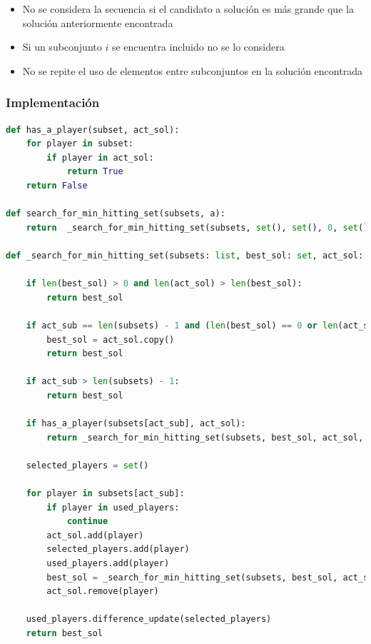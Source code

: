 \begin{itemize}
    \item No se considera la secuencia si el candidato a solución es más grande que la solución anteriormente encontrada \\
    \item Si un subconjunto $i$ se encuentra incluido no se lo considera \\
    \item No se repite el uso de elementos entre subconjuntos en la solución encontrada \\
\end{itemize}

\subsubsection{Implementación}  
\begin{lstlisting}[language=Python, caption= solución por backtracking, label=python_code]
def has_a_player(subset, act_sol):
    for player in subset:
        if player in act_sol:
            return True
    return False

def search_for_min_hitting_set(subsets, a):
    return  _search_for_min_hitting_set(subsets, set(), set(), 0, set())

def _search_for_min_hitting_set(subsets: list, best_sol: set, act_sol: set, act_sub: int, used_players: set): 

    if len(best_sol) > 0 and len(act_sol) > len(best_sol): 
        return best_sol

    if act_sub == len(subsets) - 1 and (len(best_sol) == 0 or len(act_sol) < len(best_sol)) and is_solution(act_sol, subsets):
        best_sol = act_sol.copy()
        return best_sol
    
    if act_sub > len(subsets) - 1: 
        return best_sol

    if has_a_player(subsets[act_sub], act_sol):
        return _search_for_min_hitting_set(subsets, best_sol, act_sol, act_sub + 1, used_players)
    
    selected_players = set()

    for player in subsets[act_sub]:
        if player in used_players: 
            continue
        act_sol.add(player)
        selected_players.add(player)
        used_players.add(player)
        best_sol = _search_for_min_hitting_set(subsets, best_sol, act_sol, act_sub + 1, used_players)
        act_sol.remove(player)

    used_players.difference_update(selected_players)
    return best_sol
\end{lstlisting}

